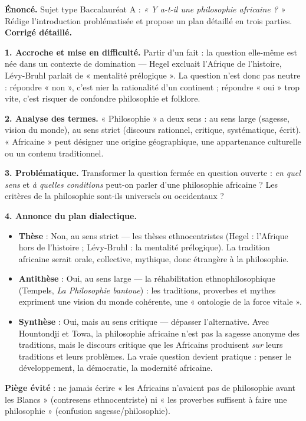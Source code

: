 \documentclass[11pt]{article}
\begin{document}
\begin{exoresolu}
\textbf{Énoncé.} Sujet type Baccalauréat A : \emph{« Y a-t-il une philosophie africaine ? »} Rédige l'introduction problématisée et propose un plan détaillé en trois parties.
\tcblower
\textbf{Corrigé détaillé.}

\textbf{1. Accroche et mise en difficulté.} Partir d'un fait : la question elle-même est née dans un contexte de domination — Hegel excluait l'Afrique de l'histoire, Lévy-Bruhl parlait de « mentalité prélogique ». La question n'est donc pas neutre : répondre « non », c'est nier la rationalité d'un continent ; répondre « oui » trop vite, c'est risquer de confondre philosophie et folklore.

\textbf{2. Analyse des termes.} « Philosophie » a deux sens : au sens large (sagesse, vision du monde), au sens strict (discours rationnel, critique, systématique, écrit). « Africaine » peut désigner une origine géographique, une appartenance culturelle ou un contenu traditionnel.

\textbf{3. Problématique.} Transformer la question fermée en question ouverte : \emph{en quel sens} et \emph{à quelles conditions} peut-on parler d'une philosophie africaine ? Les critères de la philosophie sont-ils universels ou occidentaux ?

\textbf{4. Annonce du plan dialectique.}
\begin{itemize}
\item \textbf{Thèse} : Non, au sens strict — les thèses ethnocentristes (Hegel : l'Afrique hors de l'histoire ; Lévy-Bruhl : la mentalité prélogique). La tradition africaine serait orale, collective, mythique, donc étrangère à la philosophie.
\item \textbf{Antithèse} : Oui, au sens large — la réhabilitation ethnophilosophique (Tempels, \emph{La Philosophie bantoue}) : les traditions, proverbes et mythes expriment une vision du monde cohérente, une « ontologie de la force vitale ».
\item \textbf{Synthèse} : Oui, mais au sens critique — dépasser l'alternative. Avec Hountondji et Towa, la philosophie africaine n'est pas la sagesse anonyme des traditions, mais le discours critique que les Africains produisent \emph{sur} leurs traditions et leurs problèmes. La vraie question devient pratique : penser le développement, la démocratie, la modernité africaine.
\end{itemize}
\textbf{Piège évité} : ne jamais écrire « les Africains n'avaient pas de philosophie avant les Blancs » (contresens ethnocentriste) ni « les proverbes suffisent à faire une philosophie » (confusion sagesse/philosophie).
\end{exoresolu}
\end{document}
